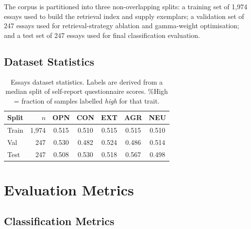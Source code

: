 \documentclass[../main.tex]{subfiles}
\begin{document}
The corpus is partitioned into three non-overlapping splits:
a training set of 1{,}974 essays used to build the retrieval index and supply
exemplars; a validation set of 247 essays used for retrieval-strategy
ablation and gamma-weight optimisation; and a test set of 247 essays used
for final classification evaluation.

\subsection{Dataset Statistics}

\begin{table}[htbp]
  \centering
  \caption{Essays dataset statistics. Labels are derived from a median split
    of self-report questionnaire scores.
    \%High = fraction of samples labelled \textit{high} for that trait.}
  \label{tab:datasets}
  \small
  \begin{tabular}{lrccccc}
    \toprule
    \textbf{Split} & \textbf{$n$}
      & \textbf{OPN} & \textbf{CON} & \textbf{EXT}
      & \textbf{AGR} & \textbf{NEU} \\
    \midrule
    Train & 1{,}974 & 0.515 & 0.510 & 0.515 & 0.515 & 0.510 \\
    Val   &   247   & 0.530 & 0.482 & 0.524 & 0.486 & 0.514 \\
    Test  &   247   & 0.508 & 0.530 & 0.518 & 0.567 & 0.498 \\
    \bottomrule
  \end{tabular}
\end{table}

\section{Evaluation Metrics}
\label{sec:metrics}

\subsection{Classification Metrics}
\end{document}

